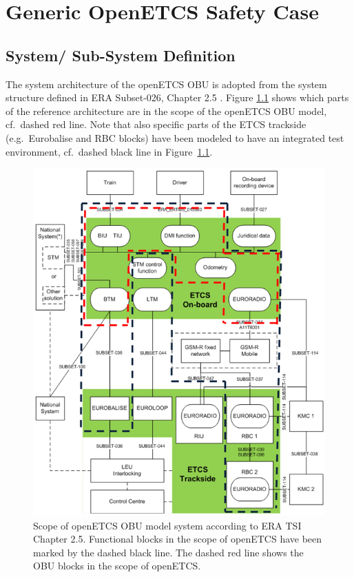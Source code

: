 \documentclass{template/openetcs_report}
\begin{document}
\chapter{Generic OpenETCS Safety Case}
\label{sec:hazardandrisk}

\section{System/ Sub-System Definition}

The system architecture of the openETCS OBU is adopted from the system structure defined in ERA Subset-026, Chapter 2.5 \cite{subset-026}. Figure \ref{f:architecture_srs} shows which parts of the reference architecture are in the scope of the openETCS OBU model, cf.~dashed red line. Note that also specific parts of the ETCS trackside (e.g.~Eurobalise and RBC blocks) have been modeled to have an integrated test environment, cf.~dashed black line in Figure~\ref{f:architecture_srs}.

\begin{figure}[H]
\centering
\includegraphics[width=.8\textwidth]{images/ArchitectureSRS}
\caption[Scope of openETCS OBU model system according to ERA TSI Chapter 2.5.]{Scope of openETCS OBU model system according to ERA TSI Chapter 2.5. Functional blocks in the scope of openETCS have been marked by the dashed black line. The dashed red line shows the OBU blocks in the scope of openETCS.}
\label{f:architecture_srs}
\end{figure}
\end{document}
